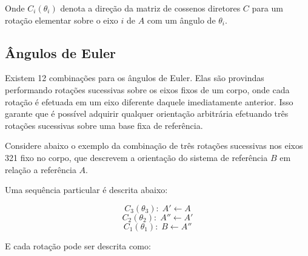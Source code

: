 Onde \begin{math}C_i(\theta_i)\end{math} denota a direção da matriz de cossenos diretores \begin{math}C\end{math} para um rotação elementar sobre o eixo \begin{math}i\end{math} de \begin{math}A\end{math} com um ângulo de \begin{math} \theta_i \end{math}.

\subsection{Ângulos de Euler}\label{sec:3.1.2.2}

Existem 12 combinações para os ângulos de Euler. Elas são provindas performando rotações sucessivas sobre os eixos fixos de um corpo, onde cada rotação é efetuada em um eixo diferente daquele imediatamente anterior. Isso garante que é possível adquirir qualquer orientação arbitrária efetuando três rotações sucessivas sobre uma base fixa de referência.

Considere abaixo o exemplo da combinação de três rotações sucessivas nos eixos 321 fixo no corpo, que descrevem a orientação do sistema de referência \begin{math} B \end{math} em relação a referência \begin{math} A \end{math}.

Uma sequência particular é descrita abaixo:

\begin{equation}C_3(\theta_3): \; A'\leftarrow A\end{equation}
\begin{equation}C_2(\theta_2): \; A''\leftarrow A'\end{equation}
\begin{equation}C_1(\theta_1): \; B\leftarrow A''\end{equation}

E cada rotação pode ser descrita como:


